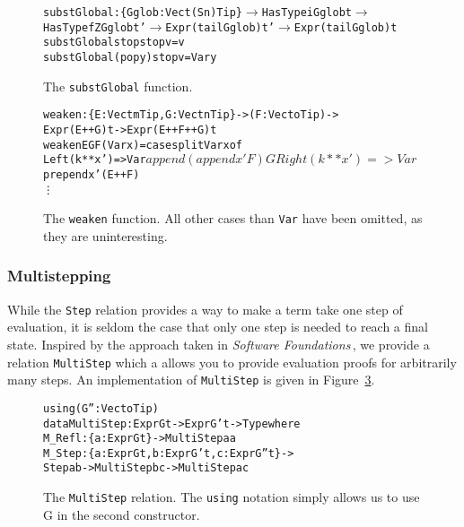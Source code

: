 \begin{figure}
\begin{alltt}
    substGlobal : \{Gglob : Vect (S n) Tip\} \(\rightarrow\) HasType i Gglob t \(\rightarrow\) 
                  HasType fZ Gglob t' \(\rightarrow\) Expr (tail Gglob) t' \(\rightarrow\) Expr (tail Gglob) t
    substGlobal stop    stop v = v
    substGlobal (pop y) stop v = Var y
\end{alltt}
\caption{The \texttt{substGlobal} function.}
\label{fig:substGlobal}
\end{figure}


\begin{figure}
\begin{alltt}
weaken : \{E: Vect m Tip, G: Vect n Tip\} -> (F: Vect o Tip) -> 
         Expr (E ++ G) t -> Expr (E ++ F ++ G) t
weaken {E} {G} F (Var x) = case splitVar x of
                             Left (k ** x') => Var $ append (append x' F) G
                             Right (k ** x') => Var $ prepend x' (E++F)
\vdots
\end{alltt}
\caption{The \texttt{weaken} function. All other cases than \texttt{Var} have been omitted, as they are uninteresting.}
\label{fig:weaken}
\end{figure}

\subsubsection{Multistepping}
While the \texttt{Step} relation provides a way to make a term take one step of evaluation, it is seldom the case that only one step is needed to reach a final state. Inspired by the approach taken in \textit{Software Foundations}\,\cite{Pierce:SF}, we provide a relation \texttt{MultiStep} which a allows you to provide evaluation proofs for arbitrarily many steps. An implementation of \texttt{MultiStep} is given in Figure~\ref{fig:MultiStep}.

\begin{figure}
\begin{alltt}
using (G'': Vect o Tip)
  data MultiStep : Expr G t -> Expr G' t -> Type where
     M_Refl : \{a: Expr G t\} -> MultiStep a a
     M_Step : \{a: Expr G t, b: Expr G' t, c: Expr G'' t\} -> 
              Step a b -> MultiStep b c -> MultiStep a c
\end{alltt}
\caption{The \texttt{MultiStep} relation. The \texttt{using} notation simply allows us to use G in the second constructor.}
\label{fig:MultiStep}
\end{figure}


